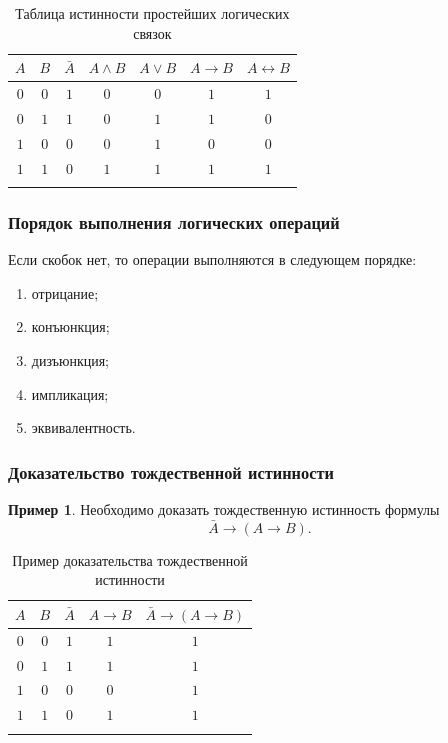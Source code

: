 \documentclass[a5paper, 11pt]{extarticle}
\theoremstyle{definition}
\newtheorem*{example*}{Пример}
\theoremstyle{definition}
\theoremstyle{definition}
\numberwithin{figure}{section}
\numberwithin{table}{section}
\begin{document}
{
\renewcommand*{\arraystretch}{1.5}
\begin{longtable}{|c|c|c|c|c|c|c|}
    \hline
    \(A\) & \(B\) & \(\bar{A}\) & \(A \land B\) & \(A \lor B\) & \(A \to B\) & \(A \leftrightarrow B\) \\
    \hline
    \(0\) & \(0\) & \(1\)       & \(0\)         & \(0\)        & \(1\)       & \(1\)                   \\
    \hline
    \(0\) & \(1\) & \(1\)       & \(0\)         & \(1\)        & \(1\)       & \(0\)                   \\
    \hline
    \(1\) & \(0\) & \(0\)       & \(0\)         & \(1\)        & \(0\)       & \(0\)                   \\
    \hline
    \(1\) & \(1\) & \(0\)       & \(1\)         & \(1\)        & \(1\)       & \(1\)                   \\
    \hline
    \caption{Таблица истинности простейших логических связок}
    \label{tab:truth-table-slc}
\end{longtable}
}


\subsubsection{Порядок выполнения логических операций}

Если скобок нет, то операции выполняются в следующем порядке:
\begin{enumerate}
    \item отрицание;
    \item конъюнкция;
    \item дизъюнкция;
    \item импликация;
    \item эквивалентность.
\end{enumerate}

\subsubsection{Доказательство тождественной истинности}

\begin{example*}
    Необходимо доказать тождественную истинность формулы
    \[
        \bar{A} \to (A \to B).
    \]

    {
    \renewcommand*{\arraystretch}{1.5}
    \begin{longtable}{|c|c|c|c|c|}
        \hline
        \(A\) & \(B\) & \(\bar{A}\) & \(A \to B\) & \(\bar{A} \to (A \to B)\) \\
        \hline
        \(0\) & \(0\) & \(1\)       & \(1\)       & \(1\)                     \\
        \hline
        \(0\) & \(1\) & \(1\)       & \(1\)       & \(1\)                     \\
        \hline
        \(1\) & \(0\) & \(0\)       & \(0\)       & \(1\)                     \\
        \hline
        \(1\) & \(1\) & \(0\)       & \(1\)       & \(1\)                     \\
        \hline
        \caption{Пример доказательства тождественной истинности}
    \end{longtable}
    }
\end{example*}
\end{document}
